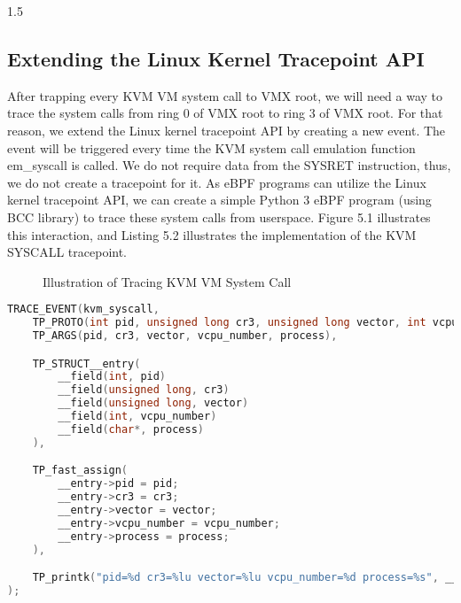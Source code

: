 \documentclass{report}
\begin{document}
\begin{spacing}{1.5}
\subsection{Extending the Linux Kernel Tracepoint API}
{\large
After trapping every KVM VM system call to VMX root, we will need a way to trace the system calls from ring 0 of VMX root to ring 3 of VMX root. For that reason, we extend the Linux kernel tracepoint API by creating a new event. The event will be triggered every time the KVM system call emulation function em\_syscall is called. We do not require data from the SYSRET instruction, thus, we do not create a tracepoint for it. As eBPF programs can utilize the Linux kernel tracepoint API, we can create a simple Python  3 eBPF program (using BCC library) to trace these system calls from userspace. Figure 5.1 illustrates this interaction, and Listing 5.2 illustrates the implementation of the KVM SYSCALL tracepoint.
\leavevmode\newline
}












\begin{figure}[ht]
\centering
  \caption{Illustration of Tracing KVM VM System Call}
\end{figure}


\leavevmode\newline


\begin{lstlisting}[caption={Implementation of KVM SYSCALL Linux Kernel Custom Tracepoint},captionpos=b, language=C]
TRACE_EVENT(kvm_syscall,
    TP_PROTO(int pid, unsigned long cr3, unsigned long vector, int vcpu_number, char* process),
    TP_ARGS(pid, cr3, vector, vcpu_number, process),

    TP_STRUCT__entry(
        __field(int, pid)
        __field(unsigned long, cr3)
        __field(unsigned long, vector)
        __field(int, vcpu_number)
        __field(char*, process)
    ),

    TP_fast_assign(
        __entry->pid = pid;
        __entry->cr3 = cr3;
        __entry->vector = vector;
        __entry->vcpu_number = vcpu_number;
        __entry->process = process;
    ),

    TP_printk("pid=%d cr3=%lu vector=%lu vcpu_number=%d process=%s", __entry->pid, __entry->cr3, __entry->vector, __entry->vcpu_number, __entry->process)
);
\end{lstlisting}








\end{spacing}
\end{document}
